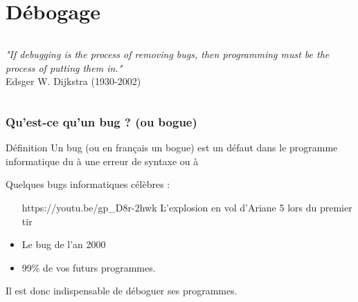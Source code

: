 \section{Débogage}
\begin{frame}
  \begin{columns}
    \column{4.8cm}
    \column{7cm}

      \textit{"If debugging is the process of removing bugs, then
programming must be the process of putting them in."}\\
      \small{
        \hfill Edsger W. Dijkstra (1930-2002)}
    
  \end{columns}
  \end{frame}

\begin{frame}
\frametitle{Qu'est-ce qu'un bug ? (ou bogue)}
\begin{block}{Définition}
Un bug (ou en français un bogue) est un défaut dans le 
programme informatique du à une erreur de syntaxe ou à
\end{block}

Quelques bugs informatiques célèbres :
\begin{itemize}
\item [https://youtu.be/gp_D8r-2hwk]{Ŀ'explosion en vol d'Ariane 5 lors du premier tir}
\item Le bug de l'an 2000
\item 99\% de vos futurs programmes.
\end{itemize}

\begin{alertblock}{}
Il est donc indispensable de déboguer ses programmes.
\end{alertblock}

\end{frame}

